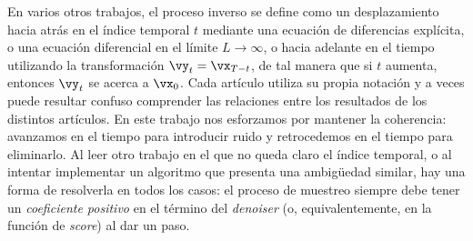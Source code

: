 \documentclass[../../book-main.tex]{subfiles}
\begin{document}
\begin{remark}
    En varios otros trabajos, el proceso inverso se define como un desplazamiento hacia atrás
    en el índice temporal \(t\) mediante una ecuación de diferencias explícita, o
    una ecuación diferencial en el límite \(L \to \infty\), o hacia adelante
    en el tiempo utilizando la transformación \(\vy_{t} = \vx_{T - t}\), de tal manera
    que si \(t\) aumenta, entonces \(\vy_{t}\) se acerca a
    \(\vx_{0}\). Cada artículo utiliza su propia notación y a veces
    puede resultar confuso comprender las relaciones entre
    los resultados de los distintos artículos. En este trabajo nos esforzamos por mantener
    la coherencia: avanzamos en el tiempo para introducir ruido y retrocedemos en
    el tiempo para eliminarlo. Al leer otro trabajo en el que no
    queda claro el índice temporal, o al intentar implementar un algoritmo
    que presenta una ambigüedad similar, hay una forma de resolverla
    en todos los casos: el proceso de muestreo siempre debe tener un
    \textit{coeficiente positivo} en el término del \textit{denoiser} (o,
    equivalentemente, en la función de \textit{score}) al dar un paso.
\end{remark}
\end{document}
